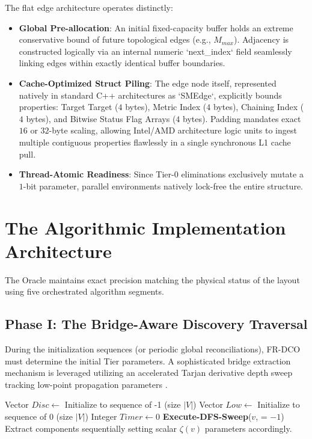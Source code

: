 \documentclass[runningheads]{llncs}
\begin{document}
The flat edge architecture operates distinctly:
\begin{itemize}
    \item \textbf{Global Pre-allocation}: An initial fixed-capacity buffer holds an extreme conservative bound of future topological edges (e.g., $M_{max}$). Adjacency is constructed logically via an internal numeric `next\_index` field seamlessly linking edges within exactly identical buffer boundaries.
    \item \textbf{Cache-Optimized Struct Piling}: The edge node itself, represented natively in standard C++ architectures as `SMEdge`, explicitly bounds properties: Target Target ($4$ bytes), Metric Index ($4$ bytes), Chaining Index ($4$ bytes), and Bitwise Status Flag Arrays ($4$ bytes). Padding mandates exact $16$ or $32$-byte scaling, allowing Intel/AMD architecture logic units to ingest multiple contiguous properties flawlessly in a single synchronous L1 cache pull.
    \item \textbf{Thread-Atomic Readiness}: Since Tier-0 eliminations exclusively mutate a $1$-bit parameter, parallel environments natively lock-free the entire structure.
\end{itemize}

\section{The Algorithmic Implementation Architecture}

The Oracle maintains exact precision matching the physical status of the layout using five orchestrated algorithm segments.

\subsection{Phase I: The Bridge-Aware Discovery Traversal}
During the initialization sequences (or periodic global reconciliations), FR-DCO must determine the initial Tier parameters. A sophisticated bridge extraction mechanism is leveraged utilizing an accelerated Tarjan derivative depth sweep tracking low-point propagation parameters \cite{ref9}.

\begin{algorithm}[H]
\caption{FR-DCO Discovery Initialization Strategy}\label{alg:bridge}
\begin{algorithmic}[1]
    \State Vector $Disc \gets$ Initialize to sequence of -1 (size $|V|$)
    \State Vector $Low \gets$ Initialize to sequence of 0 (size $|V|$)
    \State Integer $Timer \gets 0$
            \State \textbf{Execute-DFS-Sweep}($v$,  = $-1$)
        \EndIf
    \EndFor
    \State Extract components sequentially setting scalar $\zeta(v)$ parameters accordingly.
\EndProcedure
\end{algorithmic}
\end{algorithm}
\end{document}
